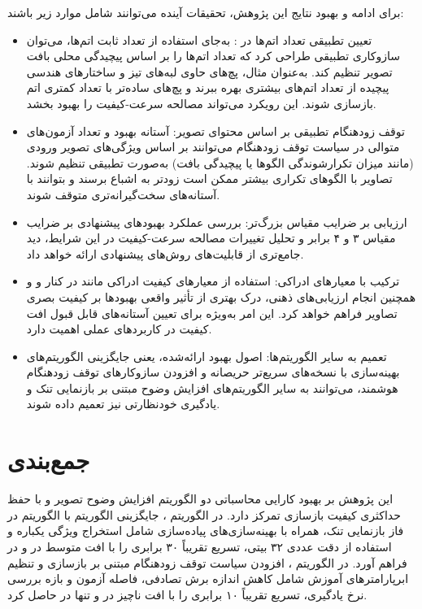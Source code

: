 برای ادامه و بهبود نتایج این پژوهش، تحقیقات آینده می‌توانند شامل موارد زیر باشند:
\begin{itemize}
    \item تعیین تطبیقی تعداد اتم‌ها در : به‌جای استفاده از تعداد ثابت اتم‌ها، می‌توان سازوکاری تطبیقی طراحی کرد که تعداد اتم‌ها را بر اساس پیچیدگی محلی بافت تصویر تنظیم کند. به‌عنوان مثال، پچ‌های حاوی لبه‌های تیز و ساختارهای هندسی پیچیده از تعداد اتم‌های بیشتری بهره ببرند و پچ‌های ساده‌تر با تعداد کمتری اتم بازسازی شوند. این رویکرد می‌تواند مصالحه سرعت-کیفیت را بهبود بخشد.

    \item توقف زودهنگام تطبیقی بر اساس محتوای تصویر: آستانه بهبود و تعداد آزمون‌های متوالی در سیاست توقف زودهنگام  می‌توانند بر اساس ویژگی‌های تصویر ورودی (مانند میزان تکرارشوندگی الگوها یا پیچیدگی بافت) به‌صورت تطبیقی تنظیم شوند. تصاویر با الگوهای تکراری بیشتر ممکن است زودتر به اشباع برسند و بتوانند با آستانه‌های سخت‌گیرانه‌تری متوقف شوند.

    \item ارزیابی بر ضرایب مقیاس بزرگ‌تر: بررسی عملکرد بهبودهای پیشنهادی بر ضرایب مقیاس ۳ و ۴ برابر و تحلیل تغییرات مصالحه سرعت-کیفیت در این شرایط، دید جامع‌تری از قابلیت‌های روش‌های پیشنهادی ارائه خواهد داد.

    \item ترکیب با معیارهای ادراکی: استفاده از معیارهای کیفیت ادراکی مانند  در کنار  و  و همچنین انجام ارزیابی‌های ذهنی، درک بهتری از تأثیر واقعی بهبودها بر کیفیت بصری تصاویر فراهم خواهد کرد. این امر به‌ویژه برای تعیین آستانه‌های قابل قبول افت کیفیت در کاربردهای عملی اهمیت دارد.

    \item تعمیم به سایر الگوریتم‌ها: اصول بهبود ارائه‌شده، یعنی جایگزینی الگوریتم‌های بهینه‌سازی با نسخه‌های سریع‌تر حریصانه و افزودن سازوکارهای توقف زودهنگام هوشمند، می‌توانند به سایر الگوریتم‌های افزایش وضوح مبتنی بر بازنمایی تنک و یادگیری خودنظارتی نیز تعمیم داده شوند.
\end{itemize}

\section{جمع‌بندی}
این پژوهش بر بهبود کارایی محاسباتی دو الگوریتم افزایش وضوح تصویر  و  با حفظ حداکثری کیفیت بازسازی تمرکز دارد. در الگوریتم ، جایگزینی الگوریتم  با الگوریتم  در فاز بازنمایی تنک، همراه با بهینه‌سازی‌های پیاده‌سازی شامل استخراج ویژگی یکباره و استفاده از دقت عددی ۳۲ بیتی، تسریع تقریباً ۳۰ برابری را با افت متوسط  در  و  در  فراهم آورد. در الگوریتم ، افزودن سیاست توقف زودهنگام مبتنی بر  بازسازی و تنظیم ابرپارامترهای آموزش شامل کاهش اندازه برش تصادفی، فاصله آزمون و بازه بررسی نرخ یادگیری، تسریع تقریباً ۱۰ برابری را با افت ناچیز  در  و تنها  در  حاصل کرد.

